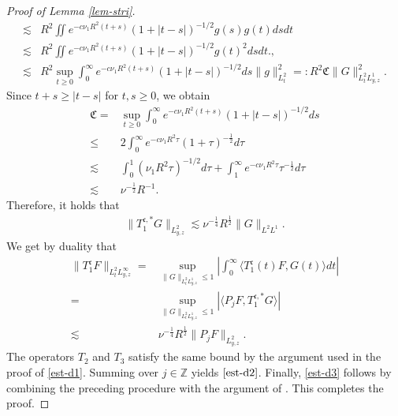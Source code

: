 \documentclass[12pt]{article}
\numberwithin{equation}{section}
\begin{document}
\begin{proof}[Proof of Lemma \ref{lem-stri}]
\begin{align*}
  		\lesssim&R^2\iint e^{-c\nu_1R^2(t+s)}(1+|t-s|)^{-1/2}g(s)g(t)dsdt\\
  		\lesssim&R^2\iint e^{-c\nu_1R^2(t+s)}(1+|t-s|)^{-1/2}g(t)^2 dsdt.,\\
  		\lesssim&R^2\sup_{t\geq0}\int_{0}^{\infty}e^{-c\nu_1R^2(t+s)}(1+|t-s|)^{-1/2}ds \|g\|_{L^2_t}^2=:R^2 \mathfrak{C} \|G\|_{L^2_tL^1_{y,z}}^2.
  	\end{align*}
  	Since $t+s\geq|t-s|$ for $t,s\geq0$, we obtain
  	\begin{align*}
  		\mathfrak{C}=&\sup_{t\geq0}\int_{0}^{\infty}e^{-c\nu_1R^2(t+s)}(1+|t-s|)^{-1/2}ds\\
  		\leq&2\int_{0}^{\infty}e^{-c\nu_1R^2 \tau}(1+\tau)^{-\frac{1}{2}}d\tau\\
  		\lesssim&\int_{0}^{1}(\nu_1R^2\tau)^{-1/2}d\tau+\int_{1}^{\infty}e^{-c\nu_1R^2\tau}\tau^{-\frac{1}{2}}d\tau\\
  		\lesssim&\nu^{-\frac{1}{2}}R^{-1}.
  	\end{align*}
  	Therefore, it holds that
  	\begin{align*}
  		\|T_1^{\mathfrak{c},*}G\|_{L^2_{y,z}}\lesssim \nu^{-\frac{1}{4}}R^{\frac{1}{2}}\|G\|_{L^2L^1}.
  	\end{align*}
  	We get by duality that
  	\begin{align*}
  		\|T^{\mathfrak{c}}_1F\|_{L^2_tL^\infty_{y,z}}=&\sup_{\|G\|_{L^2_tL^1_{y,z}}\leq1}\left|\int_{0}^{\infty} \langle T^{\mathfrak{c}}_1(t)F,G(t)\rangle dt\right| \\
  		=&\sup_{\|G\|_{L^2_tL^1_{y,z}}\leq1}\left| \langle P_jF,T_1^{\mathfrak{c},*}G\rangle \right| \\
  		\lesssim& \nu^{-\frac{1}{4}}R^{\frac{1}{2}}\|P_jF\|_{L^2_{y,z}}.
  	\end{align*}
  	The operators $T_2$ and $T_3$ satisfy the same bound by the argument used in the proof of \eqref{est-d1}. Summing over $j\in\mathbb{Z}$ yields $\eqref{est-d2}$. Finally, \eqref{est-d3} follows by combining the preceding procedure with the argument of \cite[Lemmas A.3 and A.5]{LSWZ25}. This completes the proof. 
    \end{proof}
\end{document}
